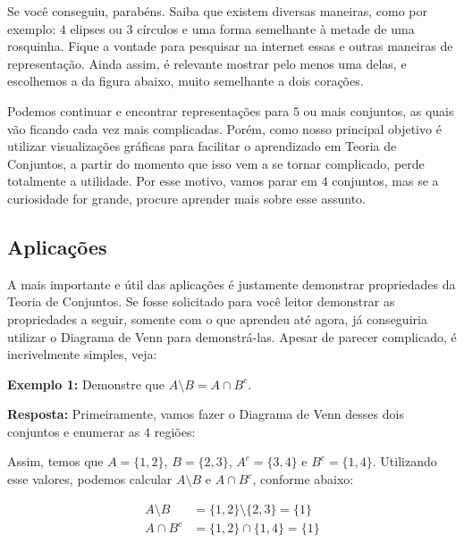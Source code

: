   Se você conseguiu, parabéns. Saiba que existem diversas maneiras, como por exemplo: $4$ elipses ou $3$ círculos e uma forma semelhante à metade de uma rosquinha. Fique a vontade para pesquisar na internet essas e outras maneiras de representação. Ainda assim, é relevante mostrar pelo menos uma delas, e escolhemos a da figura abaixo, muito semelhante a dois corações.


  Podemos continuar e encontrar representações para $5$ ou mais conjuntos, as quais vão ficando cada vez mais complicadas. Porém, como nosso principal objetivo é utilizar visualizações gráficas para facilitar o aprendizado em Teoria de Conjuntos, a partir do momento que isso vem a se tornar complicado, perde totalmente a utilidade. Por esse motivo, vamos parar em $4$ conjuntos, mas se a curiosidade for grande, procure aprender mais sobre esse assunto.

  \subsection{Aplicações}
  A mais importante e útil das aplicações é justamente demonstrar propriedades da Teoria de Conjuntos. Se fosse solicitado para você leitor demonstrar as propriedades a seguir, somente com o que aprendeu até agora, já conseguiria utilizar o Diagrama de Venn para demonstrá-las. Apesar de parecer complicado, é incrivelmente simples, veja:

  \textbf{Exemplo 1:} Demonstre que $A \setminus B = A \cap B^c$.

  \textbf{Resposta:} Primeiramente, vamos fazer o Diagrama de Venn desses dois conjuntos e enumerar as $4$ regiões:


  Assim, temos que $A=\{1,2\}$, $B=\{2,3\}$, $A^c=\{3,4\}$ e $B^c=\{1,4\}$. Utilizando esse valores, podemos calcular $A \setminus B$ e $A \cap B^c$, conforme abaixo:

  \begin{equation*}
    \begin{aligned}
      A \setminus B &= \{1,2\} \setminus \{2,3\} = \{1\}\\
      A \cap B^c &= \{1,2\} \cap \{1,4\} = \{1\}
    \end{aligned}
  \end{equation*}

